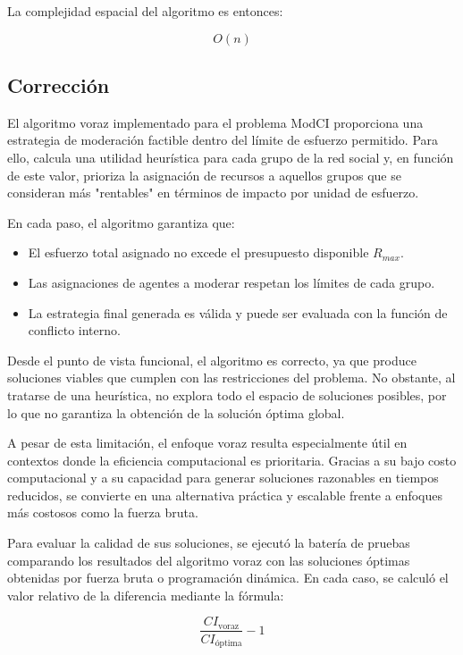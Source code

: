 \documentclass[11pt,letter]{article}
\begin{document}
    La complejidad espacial del algoritmo es entonces:

    \[
            {O}(n)
    \]

    \subsection{Corrección}

    El algoritmo voraz implementado para el problema ModCI proporciona una estrategia de moderación factible dentro del límite de esfuerzo permitido. Para ello, calcula una utilidad heurística para cada grupo de la red social y, en función de este valor, prioriza la asignación de recursos a aquellos grupos que se consideran más "rentables" en términos de impacto por unidad de esfuerzo.

    En cada paso, el algoritmo garantiza que:
    \begin{itemize}
        \item El esfuerzo total asignado no excede el presupuesto disponible $R_{max}$.
        \item Las asignaciones de agentes a moderar respetan los límites de cada grupo.
        \item La estrategia final generada es válida y puede ser evaluada con la función de conflicto interno.
    \end{itemize}

    Desde el punto de vista funcional, el algoritmo es correcto, ya que produce soluciones viables que cumplen con las restricciones del problema. No obstante, al tratarse de una heurística, no explora todo el espacio de soluciones posibles, por lo que no garantiza la obtención de la solución óptima global.

    A pesar de esta limitación, el enfoque voraz resulta especialmente útil en contextos donde la eficiencia computacional es prioritaria. Gracias a su bajo costo computacional y a su capacidad para generar soluciones razonables en tiempos reducidos, se convierte en una alternativa práctica y escalable frente a enfoques más costosos como la fuerza bruta.

    Para evaluar la calidad de sus soluciones, se ejecutó la batería de pruebas comparando los resultados del algoritmo voraz con las soluciones óptimas obtenidas por fuerza bruta o programación dinámica. En cada caso, se calculó el valor relativo de la diferencia mediante la fórmula:

    \[
        \frac{CI_{\text{voraz}}}{CI_{\text{óptima}}} - 1
    \]
    \vspace{0.5cm}
\end{document}
